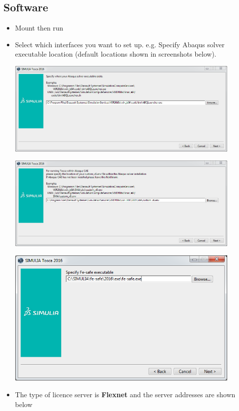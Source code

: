 \documentclass[10pt,a4paper]{article}
\begin{document}
	\subsection{Software}
	\begin{itemize}
		\item Mount  then run 
		\item Select which interfaces you want to set up. e.g. Specify Abaqus solver executable location (default locations shown in screenshots below).
		
		\includegraphics[width=0.9\textwidth]{tosca2016_abaqus_solver_location}
		
		\includegraphics[width=0.9\textwidth]{tosca2016_abaqusCAE_location}
		
		\includegraphics[width=0.9\textwidth]{tosca2016_fesafe_setup_guess}
		
		\item The type of licence server is \textbf{Flexnet} and the server addresses are shown below
		

\end{itemize}
\end{document}
